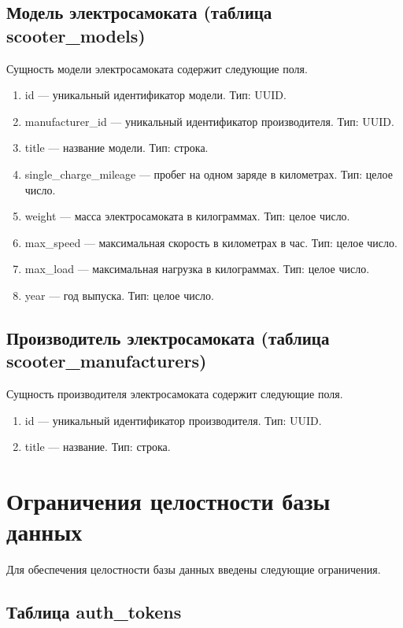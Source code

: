 \subsection{Модель электросамоката (таблица scooter\_models)}

Сущность модели электросамоката содержит следующие поля.

\begin{enumerate}
    \item id --- уникальный идентификатор модели. Тип: UUID.
    \item manufacturer\_id --- уникальный идентификатор производителя. Тип: UUID.
    \item title --- название модели. Тип: строка.
    \item single\_charge\_mileage --- пробег на одном заряде в километрах. Тип: целое число.
    \item weight --- масса электросамоката в килограммах. Тип: целое число.
    \item max\_speed --- максимальная скорость в километрах в час. Тип: целое число.
    \item max\_load --- максимальная нагрузка в килограммах. Тип: целое число.
    \item year --- год выпуска. Тип: целое число.
\end{enumerate}

\subsection{Производитель электросамоката (таблица scooter\_manufacturers)}

Сущность производителя электросамоката содержит следующие поля.

\begin{enumerate}
    \item id --- уникальный идентификатор производителя. Тип: UUID.
    \item title --- название. Тип: строка.
\end{enumerate}

\section{Ограничения целостности базы данных}

Для обеспечения целостности базы данных введены следующие ограничения.

\subsection{Таблица auth\_tokens}

